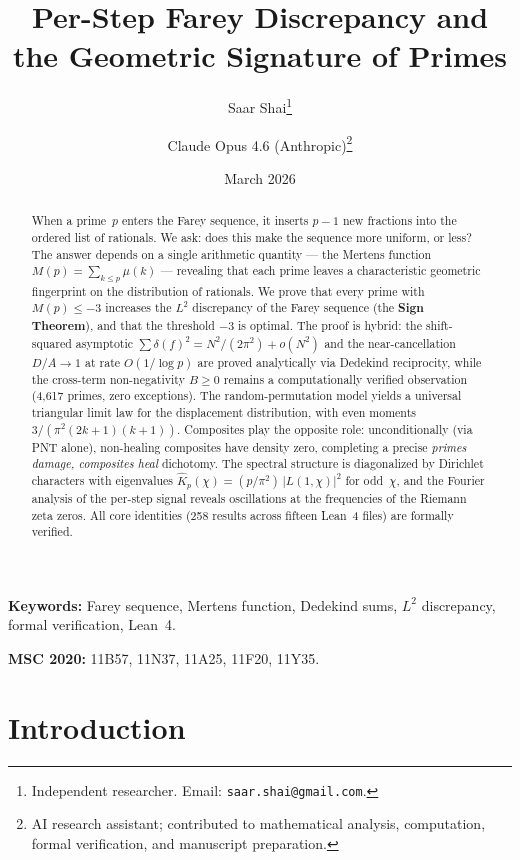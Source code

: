 \documentclass[11pt]{article}
\title{Per-Step Farey Discrepancy and the Geometric Signature of Primes}
\author{
  Saar Shai\thanks{Independent researcher. Email: \texttt{saar.shai@gmail.com}.}
  \and
  Claude Opus 4.6 (Anthropic)\thanks{AI research assistant; contributed to mathematical analysis, computation, formal verification, and manuscript preparation.}
}
\date{March 2026}
\theoremstyle{definition}
\begin{document}
\maketitle

\begin{abstract}
When a prime~$p$ enters the Farey sequence, it inserts $p-1$ new fractions
into the ordered list of rationals.  We ask: does this make the sequence
more uniform, or less?  The answer depends on a single arithmetic
quantity --- the Mertens function $M(p) = \sum_{k \le p} \mu(k)$ ---
revealing that each prime leaves a characteristic geometric fingerprint
on the distribution of rationals.  We prove that every prime with
$M(p) \le -3$ increases the $L^2$ discrepancy of the Farey sequence
(the \textbf{Sign Theorem}), and that the threshold $-3$ is optimal.
The proof is hybrid: the shift-squared asymptotic
$\sum \delta(f)^2 = N^2/(2\pi^2) + o(N^2)$ and the near-cancellation
$D/A \to 1$ at rate $O(1/\log p)$ are proved analytically via Dedekind
reciprocity, while the cross-term non-negativity $B \ge 0$ remains a
computationally verified observation (4,617 primes, zero exceptions).
The random-permutation model yields a universal triangular limit law
for the displacement distribution, with even moments
$3/(\pi^2(2k{+}1)(k{+}1))$.  Composites play the opposite role:
unconditionally (via PNT alone), non-healing composites have density
zero, completing a precise \emph{primes damage, composites heal}
dichotomy.  The spectral structure is diagonalized by Dirichlet
characters with eigenvalues
$\hat{K}_p(\chi) = (p/\pi^2)\,|L(1,\chi)|^2$ for odd~$\chi$,
and the Fourier analysis of the per-step signal reveals oscillations
at the frequencies of the Riemann zeta zeros.  All core identities
(258 results across fifteen Lean~4 files) are formally verified.
\end{abstract}

\medskip
\noindent\textbf{Keywords:} Farey sequence, Mertens function, Dedekind sums,
$L^2$ discrepancy, formal verification, Lean~4.

\noindent\textbf{MSC 2020:} 11B57, 11N37, 11A25, 11F20, 11Y35.



\section{Introduction}\label{sec:intro}
\end{document}

